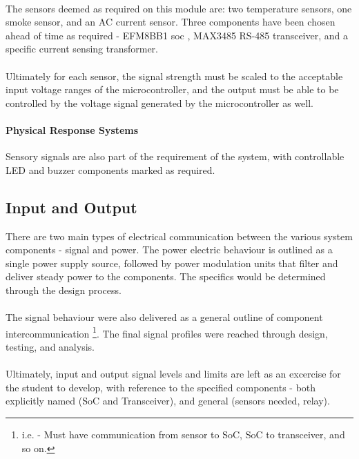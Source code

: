 \documentclass[12pt]{article}
\begin{document}
    \paragraph{}
    The sensors deemed as required on this module are: two temperature sensors, one smoke sensor, and an AC current sensor. Three components have been chosen ahead of time as required - EFM8BB1 \acrfull{soc} , MAX3485 RS-485 transceiver, and a specific current sensing transformer.
    
    \paragraph{}
    Ultimately for each sensor, the signal strength must be scaled to the acceptable input voltage ranges of the microcontroller, and the output must be able to be controlled by the voltage signal generated by the microcontroller as well.

    \paragraph{Physical Response Systems}
    Sensory signals are also part of the requirement of the system, with controllable LED and buzzer components marked as required.

    \subsection{Input and Output} 
    There are two main types of electrical communication between the various system components - signal and power. The power electric behaviour is outlined as a single power supply source, followed by power modulation units that filter and deliver steady power to the components. The specifics would be determined through the design process.

    \paragraph{}
    The signal behaviour were also delivered as a general outline of component intercommunication \footnote{i.e. - Must have communication from sensor to SoC, SoC to transceiver, and so on.}. The final signal profiles were reached through design, testing, and analysis.

    \paragraph{}
    Ultimately, input and output signal levels and limits are left as an excercise for the student to develop, with reference to the specified components - both explicitly named (SoC and Transceiver), and general (sensors needed, relay).
     
\end{document}
